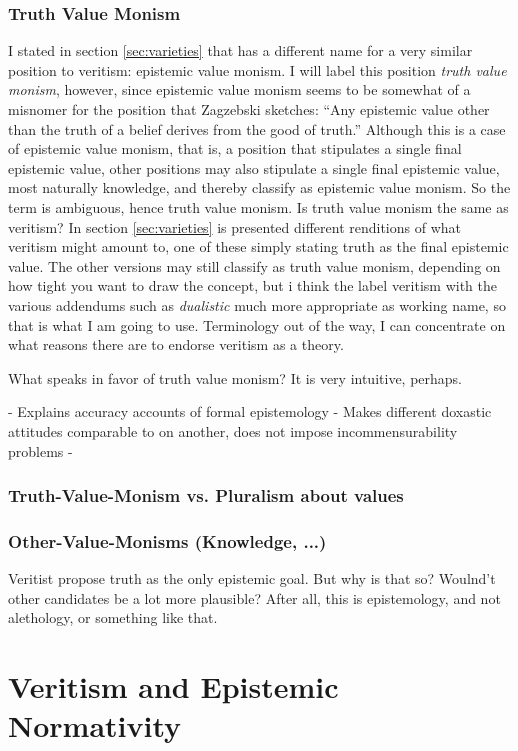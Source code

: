 \documentclass[12pt,numbers=noenddot]{scrartcl}
\begin{document}
\subsubsection{ Truth Value Monism }
I stated in section \ref{sec:varieties} that \textcite[191]{Zagzebski2004-ZAGEVM-2} has a different name for a very similar position to veritism: epistemic value monism. I will label this position \emph{truth value monism}, however, since epistemic value monism seems to be somewhat of a misnomer for the position that Zagzebski sketches: “Any epistemic value other than the truth of a belief derives from the good of truth.” Although this is a case of epistemic value monism, that is, a position that stipulates a single final epistemic value, other positions may also stipulate a single final epistemic value, most naturally knowledge, and thereby classify as epistemic value monism. So the term is ambiguous, hence truth value monism.
Is truth value monism the same as veritism? In section \ref{sec:varieties} is presented different renditions of what veritism might amount to, one of these simply stating truth as the final epistemic value. The other versions may still classify as truth value monism, depending on how tight you want to draw the concept, but i think the label veritism with the various addendums such as \emph{dualistic} much more appropriate as working name, so that is what I am going to use.
Terminology out of the way, I can concentrate on what reasons there are to endorse veritism as a theory.


What speaks in favor of truth value monism? It is very intuitive, perhaps.

- Explains accuracy accounts of formal epistemology
- Makes different doxastic attitudes comparable to on another, does not impose incommensurability problems
- 


    \subsubsection{ Truth-Value-Monism vs. Pluralism about values }
    \subsubsection{ Other-Value-Monisms (Knowledge, ...) }
    Veritist propose truth as the only epistemic goal. But why is that so? Woulnd't other candidates be a lot more plausible? After all, this is epistemology, and not alethology, or something like that.

\section{Veritism and Epistemic Normativity}
\end{document}
